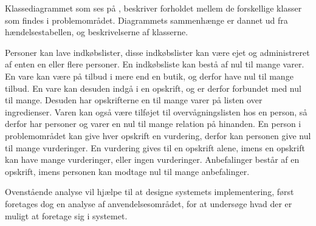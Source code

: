 Klassediagrammet som ses på , beskriver forholdet mellem de forskellige klasser som findes i problemområdet.
Diagrammets sammenhænge er dannet ud fra hændelsestabellen, og beskrivelserne af klasserne.

Personer kan lave indkøbslister, disse indkøbslister kan være ejet og administreret af enten en eller flere personer.
En indkøbsliste kan bestå af nul til mange varer.
En vare kan være på tilbud i mere end en butik, og derfor have nul til mange tilbud.
En vare kan desuden indgå i en opskrift, og er derfor forbundet med nul til mange.
Desuden har opskrifterne en til mange varer på listen over ingredienser.
Varen kan også være tilføjet til overvågningslisten hos en person, så derfor har personer og varer en nul til mange relation på hinanden.
En person i problemområdet kan give hver opskrift en vurdering, derfor kan personen give nul til mange vurderinger.
En vurdering gives til en opskrift alene, imens en opskrift kan have mange vurderinger, eller ingen vurderinger.
Anbefalinger består af en opskrift, imens personen kan modtage nul til mange anbefalinger.

Ovenstående analyse vil hjælpe til at designe systemets implementering, først foretages dog en analyse af anvendelsesområdet, for at undersøge hvad der er muligt at foretage sig i systemet.
